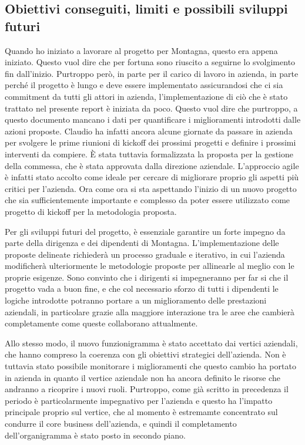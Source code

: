 \begin{multicols}{2}
\section{Obiettivi conseguiti, limiti e possibili sviluppi futuri}
	Quando ho iniziato a lavorare al progetto per Montagna, questo era appena iniziato. Questo vuol dire che per fortuna sono riuscito a seguirne lo svolgimento fin dall'inizio.
    Purtroppo però, in parte per il carico di lavoro in azienda, in parte perché il progetto è lungo e deve essere implementato assicurandosi che ci sia commitment da tutti gli attori in azienda, l'implementazione di ciò che è stato trattato nel presente report è iniziata da poco.
    Questo vuol dire che purtroppo, a questo documento mancano i dati per quantificare i miglioramenti introdotti dalle azioni proposte.
    Claudio ha infatti ancora alcune giornate da passare in azienda per svolgere le prime riunioni di kickoff dei prossimi progetti e definire i prossimi interventi da compiere.
    È stata tuttavia formalizzata la proposta per la gestione della commessa, che è stata approvata dalla direzione aziendale.
    L'approccio agile è infatti stato accolto come ideale per cercare di migliorare proprio gli aspetti più critici per l'azienda.
    Ora come ora si sta aspettando l'inizio di un nuovo progetto che sia sufficientemente importante e complesso da poter essere utilizzato come progetto di kickoff per la metodologia proposta. 

	Per gli sviluppi futuri del progetto, è essenziale garantire un forte impegno da parte della dirigenza e dei dipendenti di Montagna. L'implementazione delle proposte delineate richiederà un processo graduale e iterativo, in cui l'azienda modificherà ulteriormente le metodologie proposte per allinearle al meglio con le proprie esigenze. Sono convinto che i dirigenti si impegneranno per far si che il progetto vada a buon fine, e che col necessario sforzo di tutti i dipendenti le logiche introdotte potranno portare a un miglioramento delle prestazioni aziendali, in particolare grazie alla maggiore interazione tra le aree che cambierà completamente come queste collaborano attualmente.

    Allo stesso modo, il nuovo funzionigramma è stato accettato dai vertici aziendali, che hanno compreso la coerenza con gli obiettivi strategici dell'azienda. Non è tuttavia stato possibile monitorare i miglioramenti che questo cambio ha portato in azienda in quanto il vertice aziendale non ha ancora definito le risorse che andranno a ricoprire i nuovi ruoli.
    Purtroppo, come già scritto in precedenza il periodo è particolarmente impegnativo per l'azienda e questo ha l'impatto principale proprio sul vertice, che al momento è estremamte concentrato sul condurre il core business dell'azienda, e quindi il completamento dell'organigramma è stato posto in secondo piano. 


\end{multicols}
